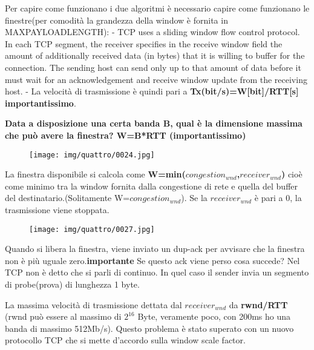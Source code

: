 \documentclass{article}
\begin{document}
\noindent Per capire come funzionano i due algoritmi è necessario capire come funzionano le finestre(per comodità la grandezza della window è fornita 
in MAXPAYLOADLENGTH):
- TCP uses a sliding window flow control protocol. In each TCP segment, the receiver specifies in the receive window field the amount
 of additionally received data (in bytes) that it is willing to buffer for the connection. The sending host can send only up to that
  amount of data before it must wait for an acknowledgement and receive window update from the receiving host. 
- La velocità di trasmissione è quindi pari a \textbf{Tx(bit/s)=W[bit]/RTT[s] importantissimo}.

\noindent \textbf{Data a disposizione una certa banda B, qual è la dimensione massima che può avere la finestra? W=B*RTT (importantissimo)}

\begin{figure}[!ht]
    \begin{center}
        \texttt{[image: img/quattro/0024.jpg]}         
    \end{center}
\end{figure}

\noindent La finestra disponibile si calcola come \textbf{W=min($congestion_{wnd}$,$receiver_{wnd}$)} cioè come minimo tra la window fornita dalla congestione 
di rete e quella del buffer del destinatario.(Solitamente W=$congestion_{wnd}$). Se la $receiver_{wnd}$ è pari a 0, la trasmissione 
viene stoppata.

\begin{figure}[!ht]
    \begin{center}
        \texttt{[image: img/quattro/0027.jpg]}         
    \end{center}
\end{figure}
\noindent Quando si libera la finestra, viene inviato un dup-ack per avvisare che la finestra non è più uguale zero.\textbf{importante}
 Se questo ack viene perso cosa succede? Nel TCP non è detto che si parli di continuo. In quel caso il sender invia un segmento di probe(prova)
 di lunghezza 1 byte.

\noindent La massima velocità di trasmissione dettata dal $receiver_{wnd}$ da \textbf{rwnd/RTT} (rwnd può essere al massimo di $2^16$ Byte, 
veramente poco, con 200ms ho una banda di massimo 512Mb/s). Questo problema è stato superato con un nuovo protocollo TCP 
che si mette d'accordo sulla window scale factor.  
\end{document}
